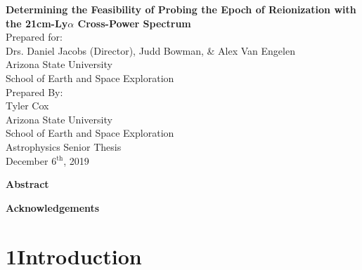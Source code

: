 \documentclass[12pt]{article}
\begin{document}
\doublespacing
\thispagestyle{empty}
\newpage
{}

\begin{center}
	{\Large \textbf{Determining the Feasibility of Probing the Epoch of Reionization with the
									21cm-Ly$\alpha$ Cross-Power Spectrum}} \\
	[0.15\textheight]

	Prepared for: \\
	Drs. Daniel Jacobs (Director), Judd Bowman, \&  Alex Van Engelen\\
	Arizona State University \\
	School of Earth and Space Exploration \\[0.15\textheight]

	Prepared By: \\
	Tyler Cox \\
	Arizona State University \\
	School of Earth and Space Exploration \\
	Astrophysics Senior Thesis \\
	December 6$^{\textrm{th}}$, 2019 \\
	[0.15\textheight]

\end{center}
\thispagestyle{empty}

\clearpage
{}

\begin{center}
	\textbf{Abstract}
\end{center}



\begingroup
\hypersetup{
	citecolor=DarkBlue,
	filecolor=black,
	linkcolor=black,
	urlcolor=DarkBlue
}
\renewcommand{\thesection}{\Roman{section}}
\tableofcontents
\listoffigures
\endgroup

\newpage

	\begin{center}
		\textbf{Acknowledgements}
	\end{center}

		




\tocless\section{\hypertarget{sec:introduction}{1\hspace{0.75em}Introduction}}
\end{document}
